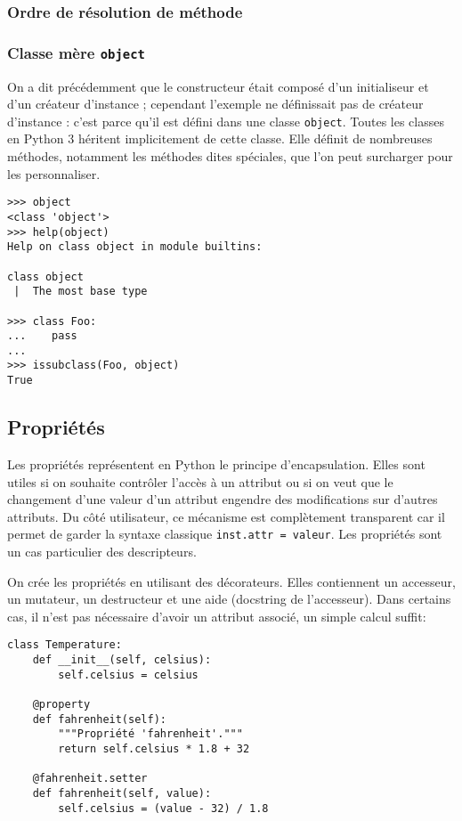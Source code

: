 \subsubsection{Ordre de résolution de méthode}

\subsubsection{Classe mère \texttt{object}}
On a dit précédemment que le constructeur était composé d'un initialiseur et d'un créateur d'instance ; cependant l'exemple ne définissait pas de créateur d'instance : c'est parce qu'il est défini dans une classe \texttt{object}. Toutes les classes en Python 3 héritent implicitement de cette classe. Elle définit de nombreuses méthodes, notamment les méthodes dites spéciales, que l'on peut surcharger pour les personnaliser.

\begin{verbatim}
>>> object
<class 'object'>
>>> help(object)
Help on class object in module builtins:

class object
 |  The most base type

>>> class Foo:
...    pass
...
>>> issubclass(Foo, object)
True
\end{verbatim}

\subsection{Propriétés}
\label{sec:proprietes}
Les propriétés représentent en Python le principe d'encapsulation. Elles sont utiles si on souhaite contrôler l'accès à un attribut ou si on veut que le changement d'une valeur d'un attribut engendre des modifications sur d'autres attributs. Du côté utilisateur, ce mécanisme est complètement transparent car il permet de garder la syntaxe classique \texttt{inst.attr = valeur}. Les propriétés sont un cas particulier des descripteurs.\bigskip

On crée les propriétés en utilisant des décorateurs. Elles contiennent un accesseur, un mutateur, un destructeur et une aide (docstring de l'accesseur). Dans certains cas, il n'est pas nécessaire d'avoir un attribut associé, un simple calcul suffit:

\begin{verbatim}
class Temperature:
    def __init__(self, celsius):
        self.celsius = celsius
    
    @property
    def fahrenheit(self):
        """Propriété 'fahrenheit'."""
        return self.celsius * 1.8 + 32
    
    @fahrenheit.setter
    def fahrenheit(self, value):
        self.celsius = (value - 32) / 1.8
\end{verbatim}

